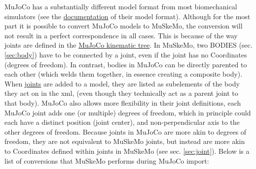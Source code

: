 \documentclass{article}
\begin{document}
MuJoCo has a substantially different model format from most biomechanical simulators (see the \href{https://mujoco.readthedocs.io/en/stable/XMLreference.html}{documentation} of their model format). Although for the most part it is possible to convert MuJoCo models to MuSkeMo, the conversion will not result in a perfect correspondence in all cases. This is because of the way joints are defined in the \href{https://mujoco.readthedocs.io/en/stable/modeling.html#ctree}{MuJoCo kinematic tree}. In MuSkeMo, two BODIES (sec. \ref{sec:body}) have to be connected by a joint, even if the joint has no Coordinates (degrees of freedom). In contrast, bodies in MuJoCo can be directly parented to each other (which welds them together, in essence creating a composite body). When \href{https://mujoco.readthedocs.io/en/stable/XMLreference.html#body-joint}{joints} are added to a model, they are listed as subelements of the body they act on in the xml, (even though they technically act as a parent joint to that body). MuJoCo also allows more flexibility in their joint definitions, each MuJoCo joint adds one (or multiple) degrees of freedom, which in principle could each have a distinct position (joint center), and non-perpendicular axis to the other degrees of freedom. Because joints in MuJoCo are more akin to degrees of freedom, they are not equivalent to MuSkeMo joints, but instead are more akin to Coordinates defined within joints in MuSkeMo (see sec. \ref{sec:joint}). Below is a list of conversions that MuSkeMo performs during MuJoCo import:
\end{document}
